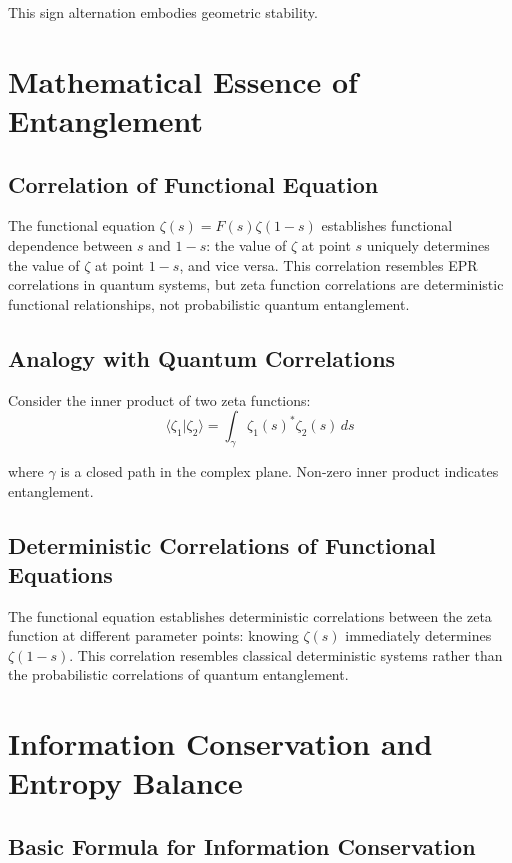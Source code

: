 \documentclass[11pt]{article}
\begin{document}
This sign alternation embodies geometric stability.

\section{Mathematical Essence of Entanglement}

\subsection{Correlation of Functional Equation}

The functional equation $\zeta(s) = F(s) \zeta(1-s)$ establishes functional dependence between $s$ and $1-s$: the value of $\zeta$ at point $s$ uniquely determines the value of $\zeta$ at point $1-s$, and vice versa. This correlation resembles EPR correlations in quantum systems, but zeta function correlations are deterministic functional relationships, not probabilistic quantum entanglement.

\subsection{Analogy with Quantum Correlations}

Consider the inner product of two zeta functions:
$$\langle \zeta_1 | \zeta_2 \rangle = \int_{\gamma} \zeta_1(s)^* \zeta_2(s) \, ds$$

where $\gamma$ is a closed path in the complex plane. Non-zero inner product indicates entanglement.

\subsection{Deterministic Correlations of Functional Equations}

The functional equation establishes deterministic correlations between the zeta function at different parameter points: knowing $\zeta(s)$ immediately determines $\zeta(1-s)$. This correlation resembles classical deterministic systems rather than the probabilistic correlations of quantum entanglement.

\section{Information Conservation and Entropy Balance}

\subsection{Basic Formula for Information Conservation}
\end{document}

